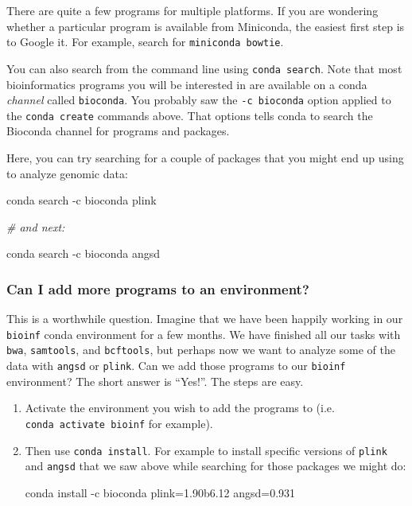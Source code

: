 \documentclass[]{krantz}
\makeatletter
\newenvironment{Shaded}{\begin{snugshade}}{\end{snugshade}}
\newcommand{\CommentTok}[1]{\textcolor[rgb]{0.37,0.37,0.37}{\textit{#1}}}
\newcommand{\ExtensionTok}[1]{#1}
\newcommand{\NormalTok}[1]{#1}
\newenvironment{kframe}{%
\medskip{}
\setlength{\fboxsep}{.8em}
 \def\at@end@of@kframe{}%
 \ifinner\ifhmode%
  \def\at@end@of@kframe{\end{minipage}}%
  \begin{minipage}{\columnwidth}%
 \fi\fi%
 \def\FrameCommand##1{\hskip\@totalleftmargin \hskip-\fboxsep
 \colorbox{shadecolor}{##1}\hskip-\fboxsep
     \hskip-\linewidth \hskip-\@totalleftmargin \hskip\columnwidth}%
 \MakeFramed {\advance\hsize-\width
   \@totalleftmargin\z@ \linewidth\hsize
   \@setminipage}}%
 {\par\unskip\endMakeFramed%
 \at@end@of@kframe}
\renewenvironment{Shaded}{\begin{kframe}}{\end{kframe}}
\makeatother
\begin{document}
There are quite a few programs for multiple platforms. If you are wondering
whether a particular program is available from Miniconda, the easiest first
step is to Google it. For example, search for \texttt{miniconda\ bowtie}.

You can also search from the command line using \texttt{conda\ search}. Note that most
bioinformatics programs you will be interested in are available on a conda
\emph{channel} called \texttt{bioconda}. You probably saw the \texttt{-c\ bioconda} option
applied to the \texttt{conda\ create} commands above. That options tells conda to search
the Bioconda channel for programs and packages.

Here, you can try searching for a couple of packages that you might
end up using to analyze genomic data:

\begin{Shaded}
\begin{Highlighting}[]
\ExtensionTok{conda}\NormalTok{ search -c bioconda plink}

\CommentTok{# and next:}

\ExtensionTok{conda}\NormalTok{ search -c bioconda angsd}
\end{Highlighting}
\end{Shaded}

\hypertarget{can-i-add-more-programs-to-an-environment}{%
\subsubsection{Can I add more programs to an environment?}\label{can-i-add-more-programs-to-an-environment}}

This is a worthwhile question. Imagine that we have been happily working in our \texttt{bioinf} conda environment
for a few months. We have finished all our tasks with \texttt{bwa}, \texttt{samtools}, and \texttt{bcftools}, but perhaps now we
want to analyze some of the data with \texttt{angsd} or \texttt{plink}. Can we add those programs to our
\texttt{bioinf} environment? The short answer is ``Yes!''. The steps are easy.

\begin{enumerate}
\def\labelenumi{\arabic{enumi}.}
\item
  Activate the environment you wish to add the programs to (i.e. \texttt{conda\ activate\ bioinf} for example).
\item
  Then use \texttt{conda\ install}. For example to install specific versions of \texttt{plink} and \texttt{angsd} that we
  saw above while searching for those packages we might do:

\begin{Shaded}
\begin{Highlighting}[]
\ExtensionTok{conda}\NormalTok{ install -c bioconda plink=1.90b6.12 angsd=0.931}
\end{Highlighting}
\end{Shaded}
\end{enumerate}
\end{document}
